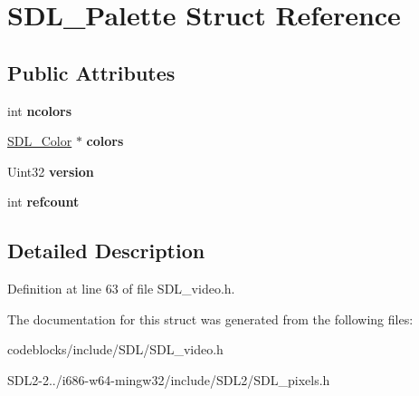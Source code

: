 \hypertarget{structSDL__Palette}{\section{S\+D\+L\+\_\+\+Palette Struct Reference}
\label{structSDL__Palette}
}
\subsection*{Public Attributes}
\begin{DoxyCompactItemize}
\item 
\hypertarget{structSDL__Palette_a81a0cc3197480e994c6b06f1f0567091}{int {\bfseries ncolors}}\label{structSDL__Palette_a81a0cc3197480e994c6b06f1f0567091}

\item 
\hypertarget{structSDL__Palette_a423274b3ab1f769f7121e4d654a9c37f}{\hyperlink{structSDL__Color}{S\+D\+L\+\_\+\+Color} $\ast$ {\bfseries colors}}\label{structSDL__Palette_a423274b3ab1f769f7121e4d654a9c37f}

\item 
\hypertarget{structSDL__Palette_a5b8d45519f6850a32f13f1602ce37a8e}{Uint32 {\bfseries version}}\label{structSDL__Palette_a5b8d45519f6850a32f13f1602ce37a8e}

\item 
\hypertarget{structSDL__Palette_a35c667737f883f973bb0a8dea143b08d}{int {\bfseries refcount}}\label{structSDL__Palette_a35c667737f883f973bb0a8dea143b08d}

\end{DoxyCompactItemize}


\subsection{Detailed Description}


Definition at line 63 of file S\+D\+L\+\_\+video.\+h.



The documentation for this struct was generated from the following files\+:\begin{DoxyCompactItemize}
\item 
codeblocks/include/\+S\+D\+L/S\+D\+L\+\_\+video.\+h\item 
S\+D\+L2-\/2../i686-\/w64-\/mingw32/include/\+S\+D\+L2/S\+D\+L\+\_\+pixels.\+h\end{DoxyCompactItemize}
